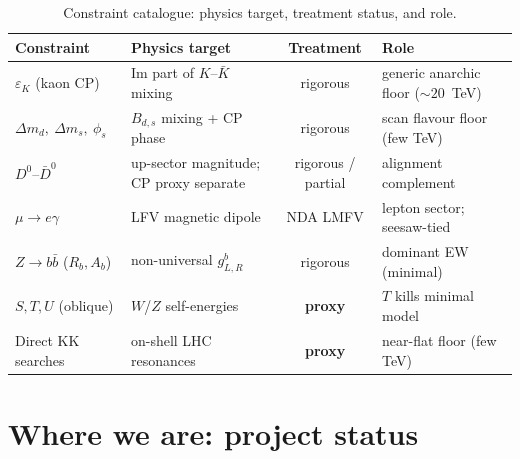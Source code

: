 \documentclass[11pt]{article}
\newcommand{\epsK}{\varepsilon_K}
\newcommand{\dmd}{\Delta m_d}
\newcommand{\dms}{\Delta m_s}
\newcommand{\phis}{\phi_s}
\begin{document}
\begin{table}[t]
\centering
\small
\begin{tabular}{@{}p{4.0cm} p{4.4cm} c p{2.9cm}@{}}
\toprule
\textbf{Constraint} & \textbf{Physics target} & \textbf{Treatment} & \textbf{Role} \\
\midrule
$\epsK$ (kaon CP) & Im part of $K$--$\bar K$ mixing & rigorous & generic anarchic floor ($\sim 20$~TeV) \\
$\dmd,\ \dms,\ \phis$ & $B_{d,s}$ mixing + CP phase & rigorous & scan flavour floor (few TeV) \\
$D^0$--$\bar D^0$ & up-sector magnitude; CP proxy separate & rigorous / partial & alignment complement \\
$\mu\to e\gamma$ & LFV magnetic dipole & NDA LMFV & lepton sector; seesaw-tied \\
$Z\to b\bar b$ ($R_b,A_b$) & non-universal $g_{L,R}^b$ & rigorous & dominant EW (minimal) \\
$S,T,U$ (oblique) & $W$/$Z$ self-energies & \textbf{proxy} & $T$ kills minimal model \\
Direct KK searches & on-shell LHC resonances & \textbf{proxy} & near-flat floor (few TeV) \\
\bottomrule
\end{tabular}
\caption{Constraint catalogue: physics target, treatment status, and role.}
\end{table}

\section{Where we are: project status}
\end{document}
